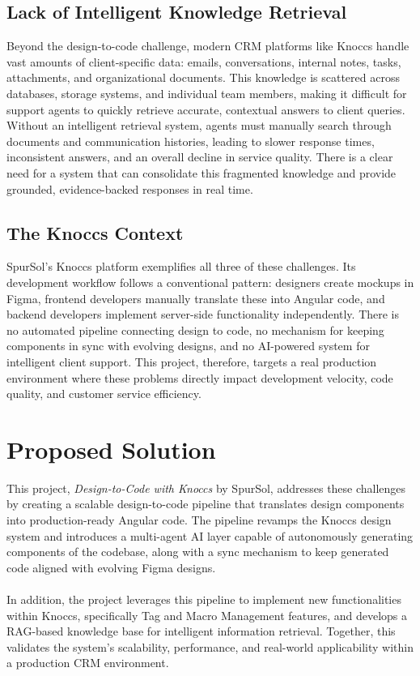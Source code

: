 \subsection{Lack of Intelligent Knowledge Retrieval}
Beyond the design-to-code challenge, modern CRM platforms like Knoccs handle vast amounts of client-specific data: emails, conversations, internal notes, tasks, attachments, and organizational documents. This knowledge is scattered across databases, storage systems, and individual team members, making it difficult for support agents to quickly retrieve accurate, contextual answers to client queries. Without an intelligent retrieval system, agents must manually search through documents and communication histories, leading to slower response times, inconsistent answers, and an overall decline in service quality. There is a clear need for a system that can consolidate this fragmented knowledge and provide grounded, evidence-backed responses in real time.

\subsection{The Knoccs Context}
SpurSol's Knoccs platform exemplifies all three of these challenges. Its development workflow follows a conventional pattern: designers create mockups in Figma, frontend developers manually translate these into Angular code, and backend developers implement server-side functionality independently. There is no automated pipeline connecting design to code, no mechanism for keeping components in sync with evolving designs, and no AI-powered system for intelligent client support. This project, therefore, targets a real production environment where these problems directly impact development velocity, code quality, and customer service efficiency.

\section{Proposed Solution}
This project, \textit{Design-to-Code with Knoccs} by SpurSol, addresses these challenges by creating a scalable design-to-code pipeline that translates design components into production-ready Angular code. The pipeline revamps the Knoccs design system and introduces a multi-agent AI layer capable of autonomously generating components of the codebase, along with a sync mechanism to keep generated code aligned with evolving Figma designs.
\\\\
In addition, the project leverages this pipeline to implement new functionalities within Knoccs, specifically Tag and Macro Management features, and develops a RAG-based knowledge base for intelligent information retrieval. Together, this validates the system's scalability, performance, and real-world applicability within a production CRM environment.

